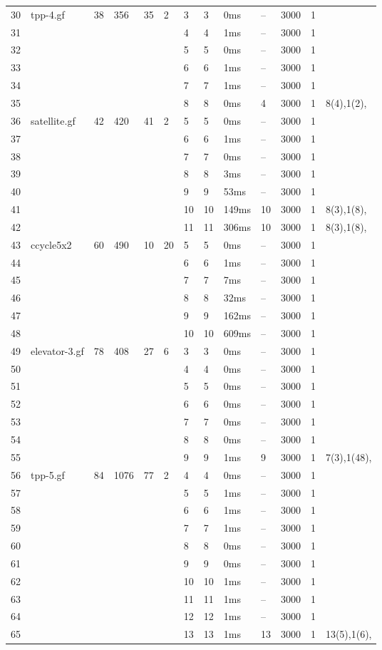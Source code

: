 \documentclass{article}
\begin{document}
\begin{longtable}{|l |l |l |l |l |l |l |l |l |l |l |l |l |}
30&tpp-4.gf&38&356&35&2&3&3&0ms&--&3000&1&\\
31&&&&&&4&4&1ms&--&3000&1&\\
32&&&&&&5&5&0ms&--&3000&1&\\
33&&&&&&6&6&1ms&--&3000&1&\\
34&&&&&&7&7&1ms&--&3000&1&\\
35&&&&&&8&8&0ms&4&3000&1&8(4),1(2),\\
36&satellite.gf&42&420&41&2&5&5&0ms&--&3000&1&\\
37&&&&&&6&6&1ms&--&3000&1&\\
38&&&&&&7&7&0ms&--&3000&1&\\
39&&&&&&8&8&3ms&--&3000&1&\\
40&&&&&&9&9&53ms&--&3000&1&\\
41&&&&&&10&10&149ms&10&3000&1&8(3),1(8),\\
42&&&&&&11&11&306ms&10&3000&1&8(3),1(8),\\
43&ccycle5x2&60&490&10&20&5&5&0ms&--&3000&1&\\
44&&&&&&6&6&1ms&--&3000&1&\\
45&&&&&&7&7&7ms&--&3000&1&\\
46&&&&&&8&8&32ms&--&3000&1&\\
47&&&&&&9&9&162ms&--&3000&1&\\
48&&&&&&10&10&609ms&--&3000&1&\\
49&elevator-3.gf&78&408&27&6&3&3&0ms&--&3000&1&\\
50&&&&&&4&4&0ms&--&3000&1&\\
51&&&&&&5&5&0ms&--&3000&1&\\
52&&&&&&6&6&0ms&--&3000&1&\\
53&&&&&&7&7&0ms&--&3000&1&\\
54&&&&&&8&8&0ms&--&3000&1&\\
55&&&&&&9&9&1ms&9&3000&1&7(3),1(48),\\
56&tpp-5.gf&84&1076&77&2&4&4&0ms&--&3000&1&\\
57&&&&&&5&5&1ms&--&3000&1&\\
58&&&&&&6&6&1ms&--&3000&1&\\
59&&&&&&7&7&1ms&--&3000&1&\\
60&&&&&&8&8&0ms&--&3000&1&\\
61&&&&&&9&9&0ms&--&3000&1&\\
62&&&&&&10&10&1ms&--&3000&1&\\
63&&&&&&11&11&1ms&--&3000&1&\\
64&&&&&&12&12&1ms&--&3000&1&\\
65&&&&&&13&13&1ms&13&3000&1&13(5),1(6),\\

\end{longtable}
\end{document}
